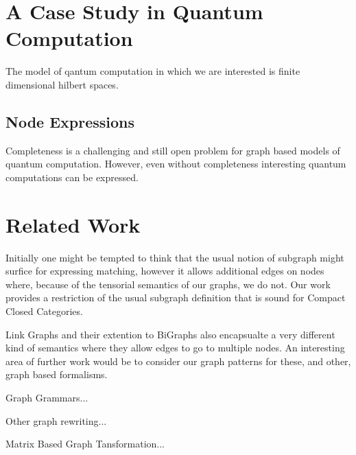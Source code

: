 \documentclass[runningheads]{llncs}
\begin{document}



\section{A Case Study in Quantum Computation}

The model of qantum computation in which we are interested is finite
dimensional hilbert spaces. 

\subsection{Node Expressions}
\label{ssec:node-expressions}


Completeness is a challenging and still open problem for graph based
models of quantum computation. However, even without completeness
interesting quantum computations can be expressed.


\section{Related Work}
\label{sec:relatedwork}

Initially one might be tempted to think that the usual notion of
subgraph might surfice for expressing matching, however it allows
additional edges on nodes where, because of the tensorial semantics of
our graphs, we do not. Our work provides a restriction of the usual
subgraph definition that is sound for Compact Closed Categories.

Link Graphs and their extention to BiGraphs also encapsualte a very
different kind of semantics where they allow edges to go to multiple
nodes. An interesting area of further work would be to consider our
graph patterns for these, and other, graph based formalisms.

Graph Grammars...

Other graph rewriting... 

Matrix Based Graph Tansformation...
\end{document}
